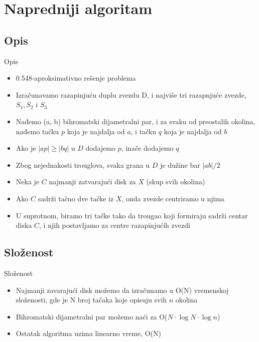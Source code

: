 \documentclass[hyperref={bookmarks=false}]{beamer}
\begin{document}
\section{Napredniji algoritam}
\subsection{Opis}
\begin{frame}{Opis}
\begin{itemize}
    \item 0.548-aproksimativno rešenje problema
    \item Izračunavamo razapinjuću duplu zvezdu D, i najviše tri razapnjuće zvezde, $S_1, S_2$ i $S_3$
    \item Nađemo (a, b) bihromatski dijametralni par, i za svaku od preostalih okolina, nađemo tačku $p$ koja je najdalja od $a$, i tačku $q$ koja je najdalja od $b$
    \item Ako je $|ap| \ge |bq|$ u $D$ dodajemo $p$, inače dodajemo $q$
    \item Zbog nejednakosti trouglova, svaka grana u $D$ je dužine bar $|ab|/2$
    \item Neka je $C$ najmanji zatvarajući disk za $X$ (skup svih okolina)
    \item Ako $C$ sadrži tačno dve tačke iz $X$, onda zvezde centriramo u njima
    \item U suprotnom, biramo tri tačke tako da trougao koji formiraju sadrži centar diska $C$, i njih postavljamo za centre razapinjućih zvezdi
\end{itemize}
\end{frame}

\subsection{Složenost}
\begin{frame}{Složenost}
\begin{itemize}
    \item Najmanji zavarajući disk možemo da izračunamo u O(N) vremenskoj složenosti, gde je N broj tačaka koje opisuju svih $n$ okolina
    \item Bihromatski dijametralni par možemo naći za O($N\cdot \log N\cdot \log n$)
    \item Ostatak algoritma uzima linearno vreme, O(N)
\end{itemize}
\end{frame}
\end{document}
